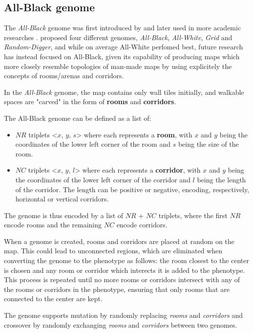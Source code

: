 \documentclass{Configuration_Files/PoliMi3i_thesis}
\begin{document}
\subsection{All-Black genome}
\label{subsec:all_black}
The \textit{All-Black} genome was first introduced by \citet{cardamone_evolving_2011} and later used in more academic researches \cite{lanzi_evolving_2014} \cite{loiacono_fight_2017} \cite{bari_evolutionary-based_2023}. \citeauthor{cardamone_evolving_2011} proposed four different genomes, \textit{All-Black}, \textit{All-White}, \textit{Grid} and \textit{Random-Digger}, and while on average All-White perfomed best, future research has instead focused on All-Black, given its capability of producing maps which more closely resemble topologies of man-made maps by using explicitely the concepts of rooms/arenas and corridors.

In the \textit{All-Black} genome, the map contains only wall tiles initially, and walkable spaces are "carved" in the form of \textbf{rooms} and \textbf{corridors}.

The All-Black genome can be defined as a list of:
\begin{itemize}
    \item $NR$ triplets <$x$, $y$, $s$> where each represents a \textbf{room}, with $x$ and $y$ being the coordinates of the lower left corner of the room and $s$ being the size of the room.
    \item $NC$ triplets <$x$, $y$, $l$> where each represents a \textbf{corridor}, with $x$ and $y$ being the coordinates of the lower left corner of the corridor and $l$ being the length of the corridor. The length can be positive or negative, encoding, respectively, horizontal or vertical corridors.
\end{itemize}
The genome is thus encoded by a list of $NR$ + $NC$ triplets, where the first $NR$ encode rooms and the remaining $NC$ encode corridors.

When a genome is created, rooms and corridors are placed at random on the map. This could lead to unconnected regions, which are eliminated when converting the genome to the phenotype as follows: the room closest to the center is chosen and any room or corridor which interects it is added to the phenotype. This process is repeated until no more rooms or corridors intersect with any of the rooms or corridors in the phenotype, ensuring that only rooms that are connected to the center are kept.

The genome supports mutation by randomly replacing \textit{rooms} and \textit{corridors} and crossover by randomly exchanging \textit{rooms} and \textit{corridors} between two genomes.
\end{document}
